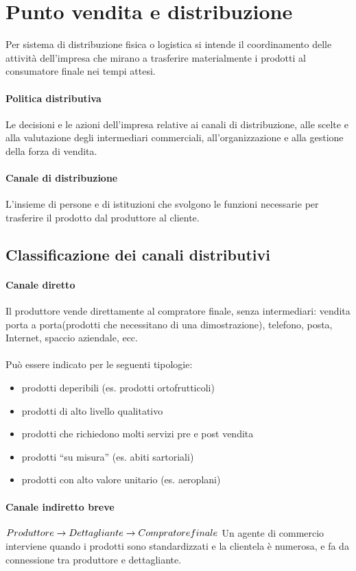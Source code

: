 \section{Punto vendita e distribuzione}
Per sistema di distribuzione fisica o logistica si intende il coordinamento delle attività dell’impresa che mirano a trasferire materialmente i prodotti al consumatore finale nei tempi attesi.
\paragraph{Politica distributiva} Le decisioni e le azioni dell’impresa relative ai canali di distribuzione, alle scelte e alla valutazione degli intermediari commerciali, all’organizzazione e alla gestione della forza di vendita.

\paragraph{Canale di distribuzione}
L’insieme di persone e di istituzioni che svolgono le funzioni necessarie per trasferire il prodotto
dal produttore al cliente.

\subsection{Classificazione dei canali distributivi}
\paragraph{Canale diretto}
Il produttore vende direttamente al compratore finale, senza intermediari: vendita porta a
porta(prodotti che necessitano di una dimostrazione), telefono, posta, Internet, spaccio aziendale, ecc.
\\
\\
Può essere indicato per le seguenti tipologie:
\begin{itemize}
	\item prodotti deperibili (es. prodotti ortofrutticoli)
	\item prodotti di alto livello qualitativo
	\item prodotti che richiedono molti servizi pre e post vendita
	\item prodotti “su misura” (es. abiti sartoriali)
	\item prodotti con alto valore unitario (es. aeroplani)
\end{itemize}

\paragraph{Canale indiretto breve} 
$ \\ Produttore \rightarrow Dettagliante \rightarrow Compratore finale \\$
Un agente di commercio interviene quando i prodotti sono standardizzati e la clientela è numerosa, e fa da connessione tra produttore e dettagliante.

